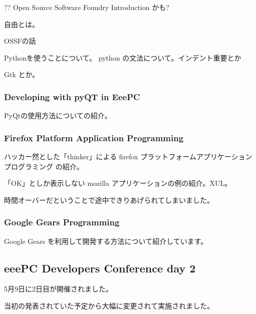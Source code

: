 \documentclass[mingoth,a4paper]{jsarticle}
\begin{document}
??
Open Source Software Foundry Introduction かも?

自由とは。

OSSFの話

Pythonを使うことについて。
python の文法について。インデント重要とか

Gtk とか。

\subsubsection{Developing with pyQT in EeePC}

PyQtの使用方法についての紹介。

\subsubsection{Firefox Platform Application Programming}

ハッカー然とした「thinker」による firefox プラットフォームアプリケーションプログラミング
の紹介。

「OK」としか表示しない mozilla アプリケーションの例の紹介。XUL。

時間オーバーだということで途中できりあげられてしまいました。

\subsubsection{Google Gears Programming}

Google Gears を利用して開発する方法について紹介しています。

\subsection{eeePC Developers Conference day 2}

5月9日に2日目が開催されました。

当初の発表されていた予定から大幅に変更されて実施されました。
\end{document}
